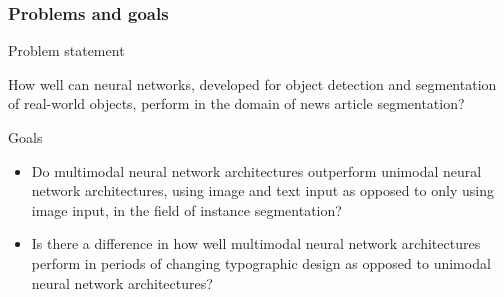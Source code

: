 \documentclass[aspectratio=1610]{beamer}
\begin{document}



\begin{frame}
  \frametitle{Problems and goals}

  \begin{Large}
    Problem statement
  \end{Large}

  \begin{small}
  How well can neural networks, developed for object detection and
segmentation of real-world objects, perform in the domain of news article
segmentation?
  \break
  \end{small}

  \begin{Large}
    Goals 
  \end{Large}


  \begin{small}
    \begin{itemize}
    \item Do multimodal neural network architectures outperform unimodal neural
network architectures, using image and text input as opposed to only
using image input, in the field of instance segmentation?
    \item Is there a difference in how well multimodal neural network architectures
perform in periods of changing typographic design as opposed to
unimodal neural network architectures?
    \end{itemize}
  \end{small}

\end{frame}
\normalpage
\end{document}
